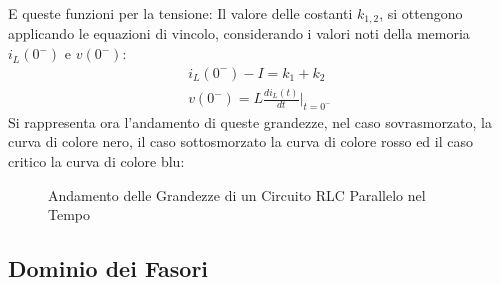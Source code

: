 \documentclass{article}
\numberwithin{equation}{subsection}
\begin{document}
E queste funzioni per la tensione:
Il valore delle costanti $k_{1,2}$, si ottengono applicando le equazioni di vincolo, considerando i valori noti della memoria $i_L(0^-)$ e $v(0^-)$:
\begin{gather*}
    i_L(0^-)-I=k_1+k_2\\
    v(0^-)=L\displaystyle\frac{di_L(t)}{dt}\bigg|_{t={0^-}}
\end{gather*}
Si rappresenta ora l'andamento di queste grandezze, nel caso sovrasmorzato, la curva di colore nero, il caso sottosmorzato la curva di colore rosso ed il caso critico la curva 
di colore blu: 
\begin{figure}[H]%
    \centering
    \qquad
    \caption{Andamento delle Grandezze di un Circuito RLC Parallelo nel Tempo}
    \label{fig:andamento-rlc-parellelo}
\end{figure}

\subsection{Dominio dei Fasori}
\end{document}
